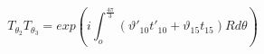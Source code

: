 \begin{equation}
T_{\theta_2} T_{\theta_3} =exp \left(
  i\int_o^{\frac{4\pi}{3}}(\vartheta'_{10}t'_{10} +
\vartheta_{15}t_{15}) R d\theta \right )
\end{equation}


